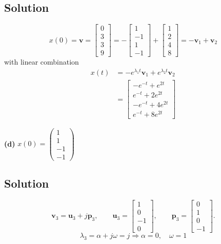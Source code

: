 \documentclass[12pt,a4paper]{article}
\begin{document}
\subsection*{Solution}
\[
x(0) = \mathbf v = \begin{bmatrix}
	0 \\ 3 \\ 3 \\ 9
\end{bmatrix} = -\begin{bmatrix}
1 \\ -1 \\ 1 \\ -1
\end{bmatrix} + \begin{bmatrix}
1 \\ 2 \\ 4 \\8
\end{bmatrix} = -\mathbf v_1 + \mathbf v_2
\]
with linear combination
\begin{align*}
	x(t) &= -e^{\lambda_1 t}\mathbf v_1 + e^{\lambda_2 t} \mathbf v_2 \\
	&= \begin{bmatrix}
		-e^{-t} + e^{2t} \\ e^{-t}+2e^{2t} \\ -e^{-t }+4e^{2t} \\ e^{-t} + 8e^{2t}
	\end{bmatrix} 
\end{align*}

\textbf{(d)} $x(0)=\begin{pmatrix}1\\1\\-1\\-1\end{pmatrix}$
\subsection*{Solution}
 
\[
\mathbf v_3=\mathbf u_3+j\mathbf p_3,\qquad
\mathbf u_3=\begin{bmatrix}1\\0\\-1\\0\end{bmatrix},\qquad
\mathbf p_3=\begin{bmatrix}0\\1\\0\\-1\end{bmatrix}.
\]
\[
\lambda_3 = \alpha + j \omega = j \Rightarrow \alpha = 0, \quad \omega = 1
\]
\end{document}
